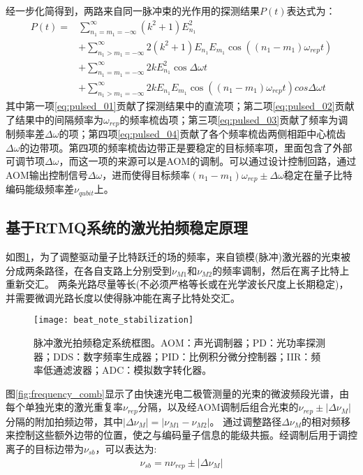 经一步化简得到，两路来自同一脉冲束的光作用的探测结果$P(t)$表达式为：
\begin{align}
    P(t)=&\sum_{n_1=m_1=-\infty}^{\infty}(k^2+1)E_{n_1}^2\label{eq:pulsed_01}\\
    &+\sum_{n_1>m_1=-\infty}^{\infty}2(k^2+1)E_{n_1}E_{m_1}\cos\left((n_1-m_1)\omega_{rep}t\right)\label{eq:pulsed_02}\\
    &+\sum_{n_1=m_1=-\infty}^{\infty}2kE_{n_1}^2\cos\Delta\omega t\label{eq:pulsed_03}\\
    &+\sum_{n_1>m_1=-\infty}^{\infty}2kE_{n_1}E_{m_1}\cos\left((n_1-m_1)\omega_{rep}t\right)cos\Delta\omega t\label{eq:pulsed_04}
\end{align}
其中第一项\eqref{eq:pulsed_01}贡献了探测结果中的直流项；第二项\eqref{eq:pulsed_02}贡献了结果中的间隔频率为$\omega_{rep}$的频率梳齿项；第三项\eqref{eq:pulsed_03}贡献了频率为调制频率差$\Delta\omega$的项；第四项\eqref{eq:pulsed_04}贡献了各个频率梳齿两侧相距中心梳齿$\Delta\omega$的边带项。第四项的频率梳齿边带正是要稳定的目标频率项，里面包含了外部可调节项$\Delta\omega$，而这一项的来源可以是AOM的调制。可以通过设计控制回路，通过AOM输出控制信号$\Delta\omega$，进而使得目标频率$(n_1-m_1)\omega_{rep}\pm \Delta\omega$稳定在量子比特编码能级频率差$\nu_{qubit}$上。

\subsection[基于RTMQ系统的激光拍频稳定原理]{基于RTMQ系统的激光拍频稳定原理}

如图\ref{fig:beat_note_stabilization}，为了调整驱动量子比特跃迁的场的频率，来自锁模(脉冲)激光器的光束被分成两条路径，在各自支路上分别受到$\nu_{M1}$和$\nu_{M2}$的频率调制，然后在离子比特上重新交汇。
两条光路尽量等长(不必须严格等长或在光学波长尺度上长期稳定)，并需要微调光路长度以使得脉冲能在离子比特处交汇。

\begin{figure}
    \centering
    \texttt{[image: beat\_note\_stabilization]}
    \caption[脉冲激光拍频稳定系统框图]{脉冲激光拍频稳定系统框图。AOM：声光调制器；PD：光功率探测器；DDS：数字频率生成器；PID：比例积分微分控制器；IIR：频率低通滤波器；ADC：模拟数字转化器。\label{fig:beat_note_stabilization}}
\end{figure}

图\ref{fig:frequency_comb}显示了由快速光电二极管测量的光束的微波频段光谱，由每个单独光束的激光重复率$\nu_{rep}$分隔，以及经AOM调制后组合光束的$\nu_{rep}\pm |\Delta \nu_M|$分隔的附加拍频边带，其中$|\Delta \nu_M|=|\nu_{M1}-\nu_{M2}|$。
通过调整路径$\Delta\nu_M$的相对频移来控制这些额外边带的位置，使之与编码量子信息的能级共振。经调制后用于调控离子的目标边带为$\nu_{sb}$，可以表达为:
\begin{align}
    \nu_{sb}=n\nu_{rep}\pm|\Delta\nu_M|
\end{align}

